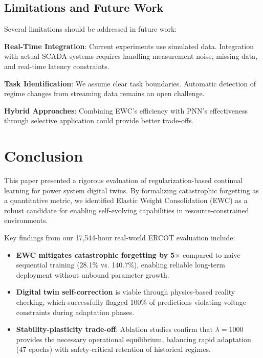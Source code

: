 \documentclass[journal,12pt,onecolumn]{IEEEtran}
\begin{document}
\subsection{Limitations and Future Work}

Several limitations should be addressed in future work:

\textbf{Real-Time Integration}: Current experiments use simulated data. Integration with actual SCADA systems requires handling measurement noise, missing data, and real-time latency constraints.

\textbf{Task Identification}: We assume clear task boundaries. Automatic detection of regime changes from streaming data remains an open challenge.

\textbf{Hybrid Approaches}: Combining EWC's efficiency with PNN's effectiveness through selective application could provide better trade-offs.

\section{Conclusion}
\label{sec:conclusion}

This paper presented a rigorous evaluation of regularization-based continual learning for power system digital twins. By formalizing catastrophic forgetting as a quantitative metric, we identified Elastic Weight Consolidation (EWC) as a robust candidate for enabling self-evolving capabilities in resource-constrained environments.

Key findings from our 17,544-hour real-world ERCOT evaluation include:

\begin{itemize}
    \item \textbf{EWC mitigates catastrophic forgetting by 5$\times$} compared to naive sequential training (28.1\% vs. 140.7\%), enabling reliable long-term deployment without unbound parameter growth.
    
    \item \textbf{Digital twin self-correction} is viable through physics-based reality checking, which successfully flagged 100\% of predictions violating voltage constraints during adaptation phases.
    
    \item \textbf{Stability-plasticity trade-off}: Ablation studies confirm that $\lambda=1000$ provides the necessary operational equilibrium, balancing rapid adaptation (47 epochs) with safety-critical retention of historical regimes.
\end{itemize}
\end{document}
